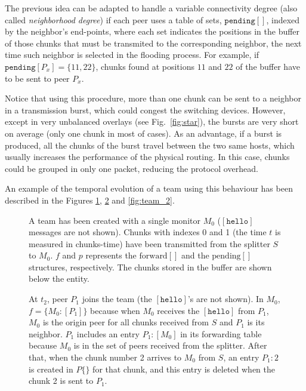 The previous idea can be adapted to handle a variable connectivity
degree (also called \emph{neighborhood degree}) if each peer uses a
table of sets, $\mathtt{pending}[]$, indexed by the neighbor's
end-points, where each set indicates the positions in the buffer of
those chunks that must be transmited to the corresponding neighbor,
the next time such neighbor is selected in the flooding process. For
example, if $\mathtt{pending}[P_x]=\{11,22\}$, chunks found at
positions $11$ and $22$ of the buffer have to be sent to peer $P_x$.

Notice that using this procedure, more than one chunk can be sent to a
neighbor in a transmission burst, which could congest the switching
devices. However, except in very unbalanced overlays (see
Fig.~\ref{fig:star}), the bursts are very short on average (only one
chunk in most of cases). As an advantage, if a burst is produced, all
the chunks of the burst travel between the two same hosts, which
usually increases the performance of the physical routing. In this
case, chunks could be grouped in only one packet, reducing the
protocol overhead.

An example of the temporal evolution of a team using this behaviour
has been described in the Figures \ref{fig:team_0}, \ref{fig:team_1}
and \ref{fig:team_2}.

\begin{figure}
  \caption{A team has been created with a single monitor $M_0$
    ($[\mathtt{hello}]$ messages are not shown). Chunks with indexes 0
    and 1 (the time $t$ is measured in chunks-time) have been
    transmitted from the splitter $S$ to $M_0$. $f$ and $p$ represents
    the $\text{forward}[]$ and the $\text{pending}[]$ structures,
    respectively. The chunks stored in the buffer are shown below the
    entity.} %
  \label{fig:team_0}
\end{figure}

\begin{figure}
  \caption{At $t_2$, peer $P_1$ joins the team (the
    $[\mathtt{hello}]$'s are not shown). In $M_0$, $f=\{M_0:[P_1]\}$
    because when $M_0$ receives the $[\mathtt{hello}]$ from $P_1$,
    $M_0$ is the origin peer for all chunks received from $S$ and
    $P_1$ is its neighbor. $P_1$ includes an entry $P_1:[M_0]$ in its
    forwarding table because $M_0$ is in the set of peers received
    from the splitter. After that, when the chunk number 2 arrives to
    $M_0$ from $S$, an entry $P_1:2$ is created in $P\{\}$ for that
    chunk, and this entry is deleted when the chunk 2 is sent to
    $P_1$.} %
  \label{fig:team_1}
\end{figure}

